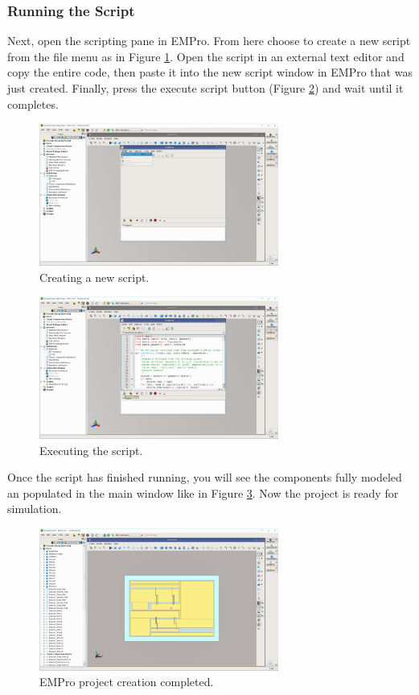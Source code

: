 \documentclass[11pt]{article}
\begin{document}
\subsubsection{Running the Script}
\label{sec-5-3-2}

Next, open the scripting pane in EMPro. From here choose to create a new script from the file menu as in Figure \ref{fig:new-script}. Open the script in an external text editor and copy the entire code, then paste it into the new script window in EMPro that was just created. Finally, press the execute script button (Figure \ref{fig:execute-script}) and wait until it completes. 


\begin{figure}[htb]
\centering
\includegraphics[width=0.7\textwidth]{./figs/empro/05_NewPyScript.PNG}
\caption{\label{fig:new-script}Creating a new script.}
\end{figure}



\begin{figure}[htb]
\centering
\includegraphics[width=0.7\textwidth]{./figs/empro/06_ExecuteScript.PNG}
\caption{\label{fig:execute-script}Executing the script.}
\end{figure}


Once the script has finished running, you will see the components fully modeled an populated in the main window like in Figure \ref{fig:script-complete}. Now the project is ready for simulation.


\begin{figure}[htb]
\centering
\includegraphics[width=0.7\textwidth]{./figs/empro/07_ScriptComplete.PNG}
\caption{\label{fig:script-complete}EMPro project creation completed.}
\end{figure}


\newpage

\end{document}
